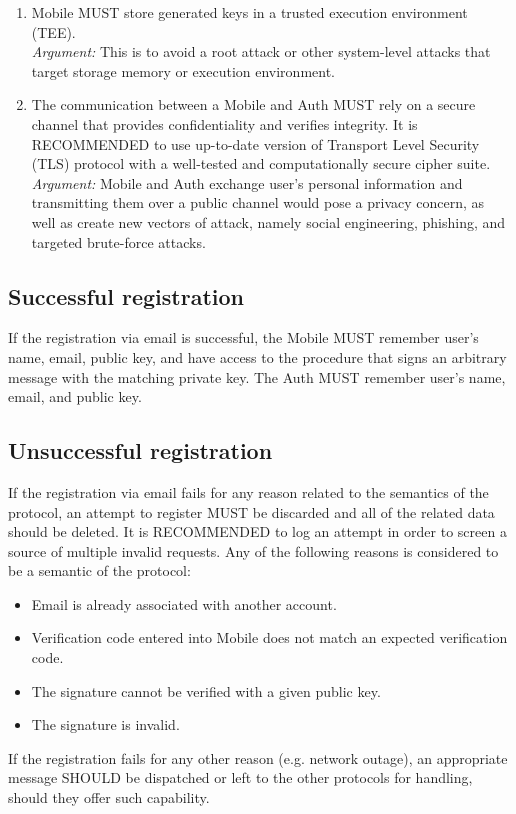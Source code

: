 \begin{enumerate}
                \item Mobile MUST store generated keys in a trusted execution environment (TEE).\\        
                \textit{Argument:} This is to avoid a root attack or other system-level attacks that target storage 
                                memory or execution environment.

                \item The communication between a Mobile and Auth MUST rely on a secure channel that provides 
                    confidentiality and verifies integrity. It is RECOMMENDED to use up-to-date version of 
                    Transport Level Security (TLS) protocol with a well-tested and computationally secure 
                    cipher suite.\\      
                \textit{Argument:} Mobile and Auth exchange user's personal information and transmitting them over a 
                                public channel would pose a privacy concern, as well as create new vectors of attack, 
                                namely social engineering, phishing, and targeted brute-force attacks.
            \end{enumerate}
        
    \subsection{Successful registration}
    If the registration via email is successful, the Mobile MUST remember user's name, email, public key, and 
    have access to the procedure that signs an arbitrary message with the matching private key. The Auth MUST 
    remember user's name, email, and public key.

    \subsection{Unsuccessful registration}
    If the registration via email fails for any reason related to the semantics of the protocol, an attempt to
    register MUST be discarded and all of the related data should be deleted. It is RECOMMENDED to log an attempt
    in order to screen a source of multiple invalid requests. Any of the following reasons is considered to be
    a semantic of the protocol:
        \begin{itemize}
            \item Email is already associated with another account.
            \item Verification code entered into Mobile does not match an expected verification code.
            \item The signature cannot be verified with a given public key.
            \item The signature is invalid.
        \end{itemize}
    If the registration fails for any other reason (e.g. network outage), an appropriate message SHOULD be
    dispatched or left to the other protocols for handling, should they offer such capability.

